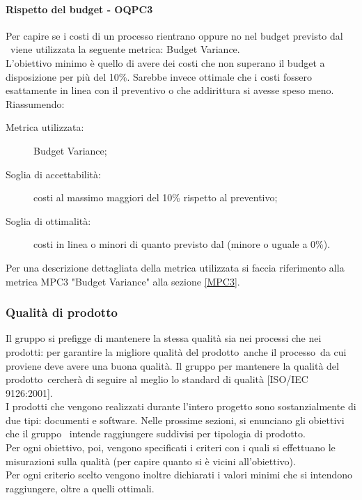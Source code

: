 \documentclass[../PianoDiQualifica.tex]{subfiles}
\begin{document}
		\paragraph{Rispetto del budget - OQPC3}
		Per capire se i costi di un processo rientrano oppure no nel budget previsto dal \pianodiprogetto\ viene utilizzata la seguente metrica: Budget Variance.\\
		L’obiettivo minimo è quello di avere dei costi che non superano il budget a disposizione per più del 10\%. Sarebbe invece ottimale che i costi fossero esattamente in linea con il preventivo o che addirittura si avesse speso meno.\\
		Riassumendo:
		\begin{description}
			\item[Metrica utilizzata:] Budget Variance;
			\item[Soglia di accettabilità:] costi al massimo maggiori del 10\% rispetto al preventivo;
			\item[Soglia di ottimalità:] costi in linea o minori di quanto previsto dal \pianodiprogetto (minore o uguale a 0\%).
		\end{description}
		Per una descrizione dettagliata della metrica utilizzata si faccia riferimento alla metrica MPC3 "Budget Variance" alla sezione \ref{MPC3}.
		
		\subsubsection{Qualità di prodotto}
		Il gruppo si prefigge di mantenere la stessa qualità sia nei processi che nei prodotti: per garantire la migliore qualità del prodotto\g\ anche il processo\g\ da cui proviene deve avere una buona qualità. Il gruppo per mantenere la qualità del prodotto\g\ cercherà di seguire al meglio lo standard di qualità [ISO/IEC 9126:2001].\\
		I prodotti che vengono realizzati durante l'intero progetto sono sostanzialmente di due tipi: documenti e software\g. Nelle prossime sezioni, si enunciano gli obiettivi che il gruppo \leaf\ intende raggiungere suddivisi per tipologia di prodotto\g.\\
		Per ogni obiettivo, poi, vengono specificati i criteri con i quali si effettuano le misurazioni sulla qualità (per capire quanto si è vicini all’obiettivo).\\
		Per ogni criterio scelto vengono inoltre dichiarati i valori minimi che si intendono raggiungere, oltre a quelli ottimali.
				
\end{document}
